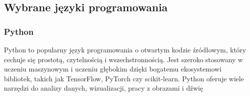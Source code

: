 \subsection{Wybrane języki programowania}
\subsubsection{Python}
Python to popularny język programowania o otwartym kodzie źródłowym, który cechuje się prostotą, czytelnością i wszechstronnością. Jest szeroko stosowany w uczeniu maszynowym i uczeniu głębokim dzięki bogatemu ekosystemowi bibliotek, takich jak TensorFlow, PyTorch czy scikit-learn. Python oferuje wiele narzędzi do analizy danych, wizualizacji, pracy z obrazami i dźwię
